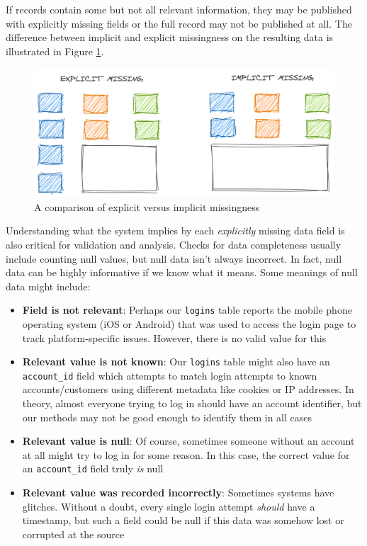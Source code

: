 \documentclass[
]{krantz}
\providecommand{\tightlist}{%
  \setlength{\itemsep}{0pt}\setlength{\parskip}{0pt}}
\begin{document}
If records contain some but not all relevant information, they may be published with explicitly missing fields or the full record may not be published at all. The difference between implicit and explicit missingness on the resulting data is illustrated in Figure \ref{fig:null-impl-expl}.

\begin{figure}

{\centering \includegraphics[width=0.9\linewidth]{figures/data-dall/missing-imp-exp} 

}

\caption{A comparison of explicit versus implicit missingness}\label{fig:null-impl-expl}
\end{figure}

Understanding what the system implies by each \emph{explicitly} missing data field is also critical for validation and analysis.
Checks for data completeness usually include counting null values, but null data isn't always incorrect.
In fact, null data can be highly informative if we know what it means. Some meanings of null data might include:

\begin{itemize}
\tightlist
\item
  \textbf{Field is not relevant}: Perhaps our \texttt{logins} table reports the mobile phone operating system (iOS or Android) that was used to access the login page to track platform-specific issues. However, there is no valid value for this
\item
  \textbf{Relevant value is not known}: Our \texttt{logins} table might also have an \texttt{account\_id} field which attempts to match login attempts to known accounts/customers using different metadata like cookies or IP addresses. In theory, almost everyone trying to log in should have an account identifier, but our methods may not be good enough to identify them in all cases
\item
  \textbf{Relevant value is null}: Of course, sometimes someone without an account at all might try to log in for some reason. In this case, the correct value for an \texttt{account\_id} field truly \emph{is} null
\item
  \textbf{Relevant value was recorded incorrectly}: Sometimes systems have glitches. Without a doubt, every single login attempt \emph{should} have a timestamp, but such a field could be null if this data was somehow lost or corrupted at the source
\end{itemize}
\end{document}

